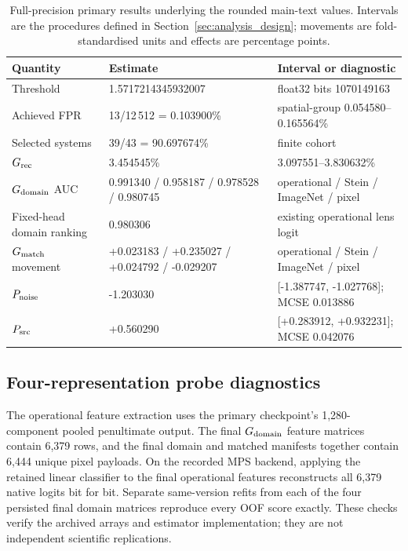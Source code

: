 \begin{table}
\caption{Full-precision primary results underlying the rounded main-text
values. Intervals are the procedures defined in Section~\ref{sec:analysis_design};
movements are fold-standardised units and effects are percentage points.}
\label{tab:primary_full_precision}
\centering
\begin{tabular}{lll}
\toprule
Quantity & Estimate & Interval or diagnostic \\
\midrule
Threshold & 1.5717214345932007 & float32 bits 1070149163 \\
Achieved FPR & 13/12\,512 = 0.103900\% &
spatial-group 0.054580--0.165564\% \\
Selected systems & 39/43 = 90.697674\% & finite cohort \\
\(G_{\rm rec}\) & 3.454545\% & 3.097551--3.830632\% \\
\(G_{\rm domain}\) AUC &
0.991340 / 0.958187 / 0.978528 / 0.980745 &
operational / Stein / ImageNet / pixel \\
Fixed-head domain ranking & 0.980306 & existing operational lens logit \\
\(G_{\rm match}\) movement &
+0.023183 / +0.235027 / +0.024792 / -0.029207 &
operational / Stein / ImageNet / pixel \\
\(P_{\rm noise}\) & -1.203030 & [-1.387747, -1.027768]; MCSE 0.013886 \\
\(P_{\rm src}\) & +0.560290 & [+0.283912, +0.932231]; MCSE 0.042076 \\
\bottomrule
\end{tabular}
\end{table}

\subsection{Four-representation probe diagnostics}
\label{app:four_representation_diagnostics}

The operational feature extraction uses the primary checkpoint's
1,280-component pooled penultimate output. The final \(G_{\rm domain}\)
feature matrices contain 6,379 rows, and the final domain and matched
manifests together contain 6,444 unique pixel payloads. On the recorded MPS
backend, applying the retained linear classifier to the final operational
features reconstructs all 6,379 native logits bit for bit. Separate
same-version refits from each of the four persisted final domain matrices
reproduce every OOF score exactly. These checks verify the archived arrays and
estimator implementation; they are not independent scientific replications.


